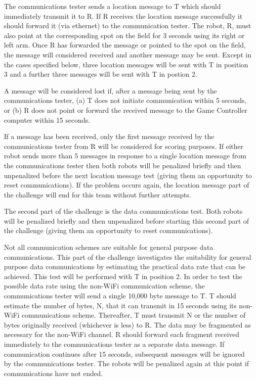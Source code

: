 \documentclass[12pt]{article}
\begin{document}
The communications tester sends a location message to T which should immediately transmit it to R.
If R receives the location message successfully it should forward it (via ethernet) to the communication tester. The robot, R, must also point at the corresponding spot on the field for 3 seconds using its right or left arm. Once R has forwarded the message or pointed to the spot on the field, the message will considered received and another message may be sent. Except in the cases specified below, three location messages will be sent with T in position 3 and a further three messages will be sent with T in postion 2.

A message will be considered lost if, after a message being sent by the communications tester, (a) T does not initiate communication within 5 seconds, or (b) R does not point or forward the received message to the Game Controller computer within 15 seconds.

If a message has been received, only the first message received by the communications tester from R will be considered for scoring purposes. If either robot sends more than 5 messages in response to a single location message from the communications tester then both robots will be penalized briefly and then unpenalized before the next location message test (giving them an opportunity to reset communications). If the problem occurs again, the location message part of the challenge will end for this team without further attempts.

The second part of the challenge is the data communications test. Both robots will be penalized briefly and then unpenalized before starting this second part of the challenge (giving them an opportunity to reset communications).

Not all communication schemes are suitable for general purpose data communications. This part of the challenge investigates the suitability for general purpose data communications by estimating the practical data rate that can be achieved. This test will be performed with T in position 2.
In order to test the possible data rate using the non-WiFi communication scheme, the communications tester will send a single 10,000 byte message to T. T should estimate the number of bytes, N, that it can transmit in 15 seconds using its non-WiFi communications scheme. Thereafter, T must transmit N or the number of bytes originally received (whichever is less) to R. The data may be fragmented as necessary for the non-WiFi channel. R should forward each fragment received immediately to the communications tester as a separate data message. If communication continues after 15 seconds, subsequent messages will be ignored by the communications tester. The robots will be penalized again at this point if communications have not ended.
\end{document}
